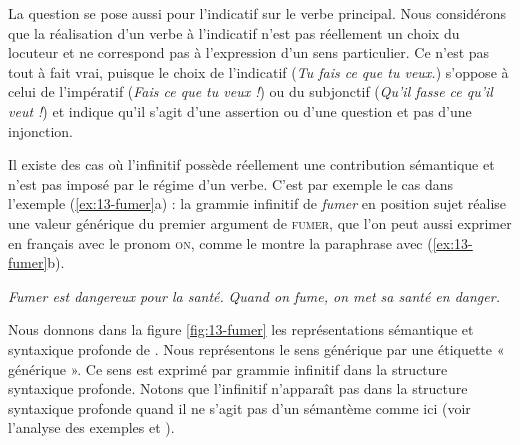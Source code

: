 La question se pose aussi pour l’indicatif sur le verbe principal. Nous considérons que la réalisation d’un verbe à l’indicatif n’est pas réellement un choix du locuteur et ne correspond pas à l’expression d’un sens particulier. Ce n’est pas tout à fait vrai, puisque le choix de l’indicatif (\textit{Tu fais ce que tu veux.}) s’oppose à celui de l’impératif (\textit{Fais ce que tu veux !}) ou du subjonctif (\textit{Qu’il fasse ce qu’il veut !}) et indique qu’il s’agit d’une assertion ou d’une question et pas d’une injonction.

Il existe des cas où l’infinitif possède réellement une contribution sémantique et n’est pas imposé par le régime d’un verbe. C’est par exemple le cas dans l’exemple (\ref{ex:13-fumer}a) : la grammie infinitif de \textit{fumer} en position sujet réalise une valeur générique du premier argument de \textsc{fumer}, que l’on peut aussi exprimer en français avec le pronom \textsc{on}, comme le montre la paraphrase avec (\ref{ex:13-fumer}b). 

\ea\label{ex:13-fumer}
\ea \textit{Fumer est dangereux pour la santé.}
\ex \textit{Quand on fume, on met sa santé en danger.}\z\z

Nous donnons dans la figure \ref{fig:13-fumer} les représentations sémantique et syntaxique profonde de . Nous représentons le sens générique par une étiquette « générique ». Ce sens est exprimé par grammie infinitif dans la structure syntaxique profonde. Notons que l’infinitif n’apparaît pas dans la structure syntaxique profonde quand il ne s’agit pas d’un sémantème comme ici (voir l’analyse des exemples  et ).

